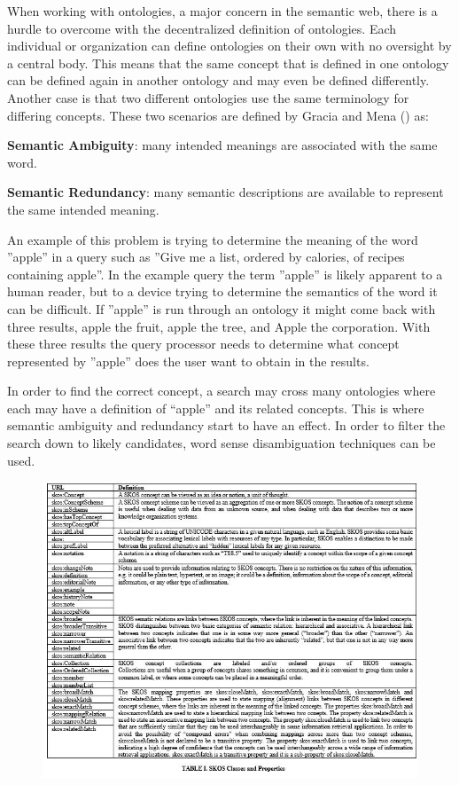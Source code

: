 \documentclass[10pt,journal,compsoc]{IEEEtran}
\begin{document}
When working with ontologies, a major concern in the semantic web, there is a hurdle to overcome with the decentralized definition of ontologies. Each individual or organization can define ontologies on their own with no oversight by a central body. This means that the same concept that is defined in one ontology can be defined again in another ontology and may even be defined differently. Another case is that two different ontologies use the same terminology for differing concepts. These two scenarios are defined by Gracia and Mena (\cite{gracia_dealing_2011}) as:
\begin{center} \textbf{Semantic Ambiguity}: many intended meanings are associated with the same word.\end{center}
\begin{center} \textbf{Semantic Redundancy}: many semantic descriptions are available to represent the same intended meaning.\end{center}

An example of this problem is trying to determine the meaning of the word ''apple'' in a query such as ''Give me a list, ordered by calories, of recipes containing apple''. In the example query the term ''apple'' is likely apparent to a human reader, but to a device trying to determine the semantics of the word it can be difficult. If ''apple'' is run through an ontology it might come back with three results, apple the fruit, apple the tree, and Apple the corporation. With these three results the query processor needs to determine what concept represented by ''apple'' does the user want to obtain in the results.

In order to find the correct concept, a search may cross many ontologies where each may have a definition of “apple” and its related concepts. This is where semantic ambiguity and redundancy start to have an effect. In order to filter the search down to likely candidates, word sense disambiguation techniques can be used.

\begin{figure}[hbt]
\begin{center}
\includegraphics[width=6in]{DanielaTable1.JPG}       
\label{fig1}
\end{center}
\end{figure}
\end{document}
